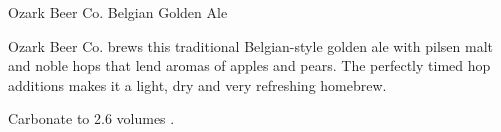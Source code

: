 \begin{recipie}{Ozark Beer Co. Belgian Golden Ale}

\begin{aboutblock}
Ozark Beer Co. brews this traditional Belgian-style golden ale with pilsen malt
and noble hops that lend aromas of apples and pears. The perfectly timed hop
additions makes it a light, dry and very refreshing homebrew.
\end{aboutblock}


\begin{methodandtiming}
 
\begin{mashsteps}
\end{mashsteps}

\begin{fermentationsteps}
\end{fermentationsteps}

\begin{directions}
Carbonate to 2.6 volumes .
\end{directions}

\end{methodandtiming}

\pagebreak

\begin{ingredientsblock}

\begin{malts}
\end{malts}

\begin{hops}
\end{hops}

\begin{yeasts}
\end{yeasts}

\end{ingredientsblock}

\end{recipie}